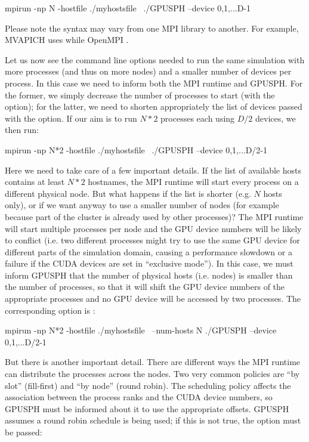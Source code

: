 \documentclass{../GPUSPHtemplate}
\begin{document}
\begin{shellcode}
mpirun -np N -hostfile ./myhostsfile \
./GPUSPH --device 0,1,...D-1
\end{shellcode}

Please note the syntax may vary from one MPI library to another. 
For example, MVAPICH uses \cmd{-hostfile} while OpenMPI .

Let us now see the command line options needed to run the same simulation 
with more processes (and thus on more nodes) and a smaller number of devices per process. 
In this case we need to inform both the MPI runtime and GPUSPH. 
For the former, we simply decrease the number of processes to start (with the  option); 
for the latter, we need to shorten appropriately the list of devices 
passed with the \cmd{--device} option. 
If our aim is to run $N*2$ processes each using $D/2$ devices, we then run:
\begin{shellcode}
mpirun -np N*2 -hostfile ./myhostsfile \
./GPUSPH --device 0,1,...D/2-1
\end{shellcode}

Here we need to take care of a few important details. If the list of available 
hosts contains at least $N*2$ hostnames, the MPI runtime will start every process 
on a different physical node. But what happens if the list is shorter 
(e.g. $N$ hosts only), or if we want anyway to use a smaller number of 
nodes (for example because part of the cluster is already used by other processes)? 
The MPI runtime will start multiple processes per node and the GPU device 
numbers will be likely to conflict (i.e. two different processes might 
try to use the same GPU device for different parts of the simulation domain, 
causing a performance slowdown or a failure if the CUDA devices are set in “exclusive mode”). 
In this case, we must inform GPUSPH that the number of physical hosts (i.e. nodes) 
is smaller than the number of processes, so that it will shift the GPU device 
numbers of the appropriate processes and no GPU device will be accessed by two processes. 
The corresponding option is \cmd{--num-hosts}:

\begin{shellcode}
mpirun -np N*2 -hostfile ./myhostsfile \
--num-hosts N ./GPUSPH --device 0,1,...D/2-1
\end{shellcode}

But there is another important detail. There are different ways the MPI 
runtime can distribute the processes across the nodes. 
Two very common policies are “by slot” (fill-first) and “by node” 
(round robin). 
The scheduling policy affects the association between the process ranks 
and the CUDA device numbers, so GPUSPH must be informed about it to use 
the appropriate offsets. GPUSPH assumes a round robin schedule is being used; 
if this is not true, the \cmd{--byslot-scheduling} option must be passed:
\end{document}
